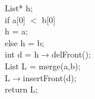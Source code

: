 \begin{sectionbox}
\begin{sectionbox}
{{                List* h;\\
                if a[0] $<$ b[0]\\
                \hspace*{1em} h = a; \\
                else h = b;\\
                int d = h$\rightarrow$delFront();\\
                List L = merge(a,b);\\
                L$\rightarrow$insertFront(d);\\
                return L;\\
            }}
    \end{sectionbox}

\end{sectionbox}

